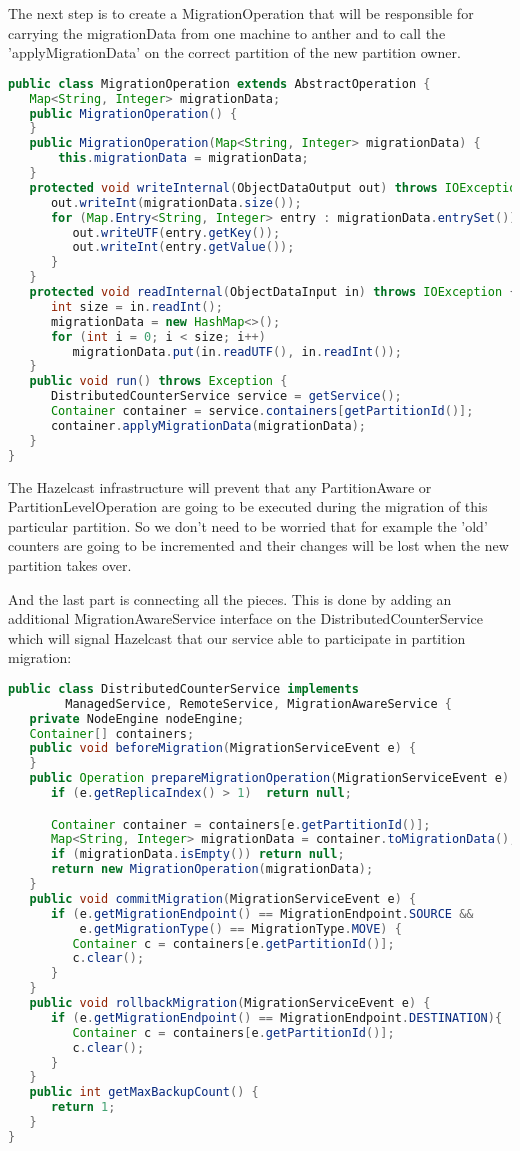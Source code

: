 The next step is to create a MigrationOperation that will be responsible for carrying the migrationData from one machine to anther and to call the 'applyMigrationData' on the correct partition of the new partition owner.
\begin{lstlisting}[language=java]
public class MigrationOperation extends AbstractOperation {
   Map<String, Integer> migrationData;
   public MigrationOperation() {
   }
   public MigrationOperation(Map<String, Integer> migrationData) {
       this.migrationData = migrationData;
   }
   protected void writeInternal(ObjectDataOutput out) throws IOException {
      out.writeInt(migrationData.size());
      for (Map.Entry<String, Integer> entry : migrationData.entrySet()) {
         out.writeUTF(entry.getKey());
         out.writeInt(entry.getValue());
      }
   }
   protected void readInternal(ObjectDataInput in) throws IOException {
      int size = in.readInt();
      migrationData = new HashMap<>();
      for (int i = 0; i < size; i++)
         migrationData.put(in.readUTF(), in.readInt());
   }
   public void run() throws Exception {
      DistributedCounterService service = getService();
      Container container = service.containers[getPartitionId()];
      container.applyMigrationData(migrationData);
   }
}
\end{lstlisting}

The Hazelcast infrastructure will prevent that any PartitionAware or PartitionLevelOperation are going to be executed during the migration of this particular partition. So we don't need to be worried that for example the 'old' counters are going to be incremented and their changes will be lost when the new partition takes over.

And the last part is connecting all the pieces. This is done by adding an additional MigrationAwareService interface on the DistributedCounterService which will signal Hazelcast that our service able to participate in partition migration:
\begin{lstlisting}[language=java]
public class DistributedCounterService implements 
        ManagedService, RemoteService, MigrationAwareService {
   private NodeEngine nodeEngine;
   Container[] containers;
   public void beforeMigration(MigrationServiceEvent e) {
   } 
   public Operation prepareMigrationOperation(MigrationServiceEvent e) {
      if (e.getReplicaIndex() > 1)  return null;

      Container container = containers[e.getPartitionId()];
      Map<String, Integer> migrationData = container.toMigrationData();
      if (migrationData.isEmpty()) return null;
      return new MigrationOperation(migrationData);
   }
   public void commitMigration(MigrationServiceEvent e) {
      if (e.getMigrationEndpoint() == MigrationEndpoint.SOURCE && 
          e.getMigrationType() == MigrationType.MOVE) {
         Container c = containers[e.getPartitionId()];
         c.clear();
      }
   }
   public void rollbackMigration(MigrationServiceEvent e) {
      if (e.getMigrationEndpoint() == MigrationEndpoint.DESTINATION){
         Container c = containers[e.getPartitionId()];
         c.clear();
      }
   }
   public int getMaxBackupCount() {
      return 1;
   }
}
\end{lstlisting}

